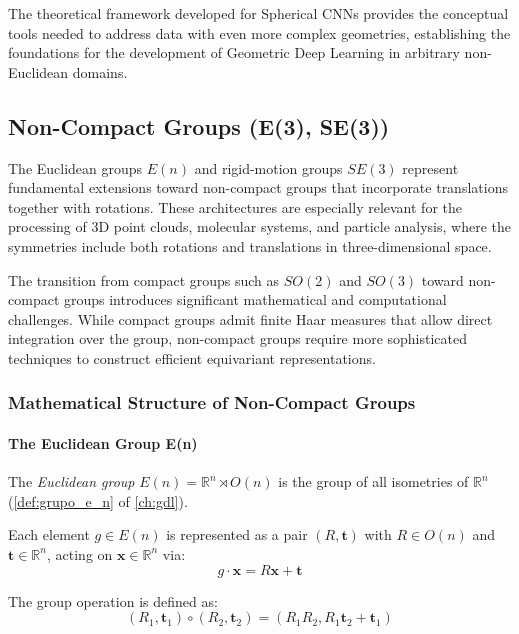 The theoretical framework developed for Spherical CNNs provides the conceptual tools needed to address data with even more complex geometries, establishing the foundations for the development of Geometric Deep Learning in arbitrary non-Euclidean domains.

\subsection{Non-Compact Groups (E(3), SE(3))}\label{subsec:grupos_no_compactos}

The Euclidean groups $E(n)$ and rigid-motion groups $SE(3)$ represent fundamental extensions toward non-compact groups that incorporate translations together with rotations. These architectures are especially relevant for the processing of 3D point clouds, molecular systems, and particle analysis, where the symmetries include both rotations and translations in three-dimensional space.

The transition from compact groups such as $SO(2)$ and $SO(3)$ toward non-compact groups introduces significant mathematical and computational challenges. While compact groups admit finite Haar measures that allow direct integration over the group, non-compact groups require more sophisticated techniques to construct efficient equivariant representations.

\subsubsection{Mathematical Structure of Non-Compact Groups}

\paragraph{The Euclidean Group E(n)}

The \textit{Euclidean group} $E(n) = \mathbb{R}^n \rtimes O(n)$ is the group of all isometries of $\mathbb{R}^n$ (\autoref{def:grupo_e_n} of \autoref{ch:gdl}).\label{def:grupo_euclidiano}

Each element $g \in E(n)$ is represented as a pair $(R, \mathbf{t})$ with $R \in O(n)$ and $\mathbf{t} \in \mathbb{R}^n$, acting on $\mathbf{x} \in \mathbb{R}^n$ via:
\begin{equation}
g \cdot \mathbf{x} = R\mathbf{x} + \mathbf{t}
\end{equation}

The group operation is defined as:
\begin{equation}
(R_1, \mathbf{t}_1) \circ (R_2, \mathbf{t}_2) = (R_1 R_2, R_1 \mathbf{t}_2 + \mathbf{t}_1)
\end{equation}

